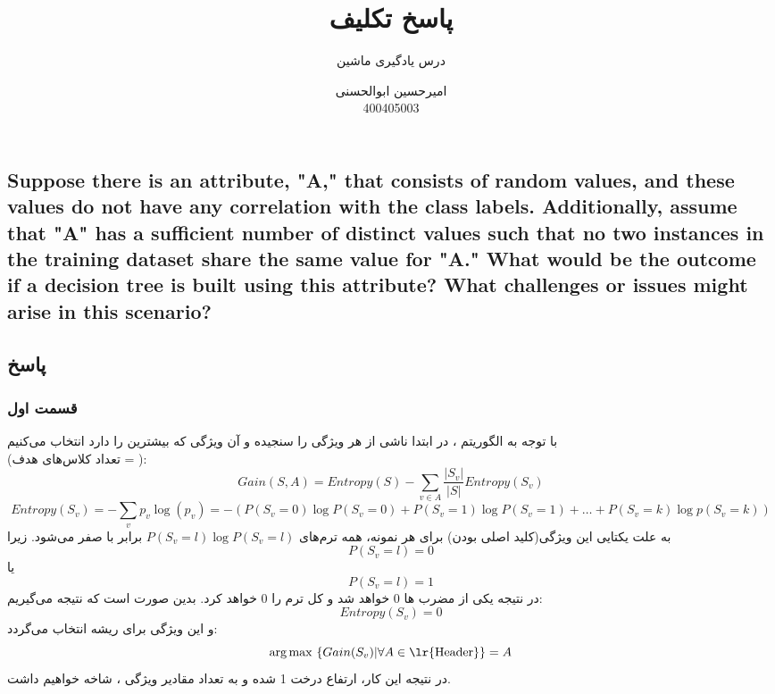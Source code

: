 \documentclass{article}
\title{پاسخ تکلیف 
	\lr{Decision Tree (ID3)}
}
\author{درس یادگیری ماشین}
\date{
	امیرحسین ابوالحسنی\\
	400405003
	}
\DeclareMathOperator*{\argmax}{arg\,max}
\begin{document}
	\maketitle
	
	\begin{latin}
		\section{Suppose there is an attribute, "A," that consists of random values, and these
			values do not have any correlation with the class labels. Additionally, assume that
			"A" has a sufficient number of distinct values such that no two instances in the
			training dataset share the same value for "A." What would be the outcome if a
			decision tree is built using this attribute? What challenges or issues might arise in
			this scenario?}
	\end{latin}
	\noindent
	\subsection*{پاسخ}
	\subsubsection*{قسمت اول}
	با توجه به الگوریتم 
	،
	در ابتدا 
	ناشی از هر ویژگی را سنجیده و آن ویژگی که بیشترین 
	را دارد انتخاب می‌کنیم\\
	(تعداد کلاس‌های هدف = ):
	\[
	Gain(S, A) = Entropy(S) - \sum_{v \in A} \frac{| S_v |}{| S |}Entropy(S_v)
	\] 
	\[
	Entropy(S_v) = -\sum_{v} p_v\log (p_v) = -(P(S_v = 0) \log P(S_v = 0) + P(S_v = 1) \log P(S_v = 1) + \dots‌+ P(S_v = k) \log p(S_v = k))
	\]
	به علت یکتایی این ویژگی(کلید اصلی بودن) برای هر نمونه، همه ترم‌های $P(S_v = l) \log P(S_v = l)$ برابر با صفر می‌شود.  زیرا 
	\[
	P(S_v = l) = 0
	\]
	یا
	\[
	P(S_v = l) = 1
	\]
	 در نتیجه یکی از مضرب ها 0 خواهد شد و کل ترم‌ را 0 خواهد کرد. بدین صورت است که نتیجه می‌گیریم:
	\[
	Entropy(S_v) = 0
	\]
	و این ویژگی برای ریشه انتخاب می‌گردد:
	\[
	\argmax ~ \{Gain(S_v) |\forall A \in \text{\lr{Header}}\} = A
	\]
	در نتیجه این کار، ارتفاع درخت 1 شده و به تعداد مقادیر ویژگی 
	،
شاخه خواهیم داشت.
\end{document}

